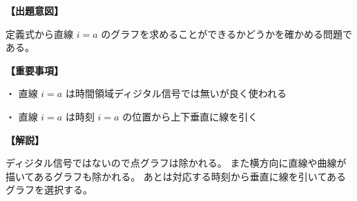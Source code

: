\noindent \textbf{【出題意図】}

\noindent 定義式から直線 $i = a$ のグラフを求めることができるかどうかを確かめる問題である。

\vspace{1em}
\noindent \textbf{【重要事項】}

\bigskip
\noindent ・ 直線 $i = a$ は時間領域ディジタル信号では無いが良く使われる

\bigskip
\noindent ・ 直線 $i = a$ は時刻 $i=a$ の位置から上下垂直に線を引く


\vspace{1em}
\noindent \textbf{【解説】}

\noindent ディジタル信号ではないので点グラフは除かれる。
また横方向に直線や曲線が描いてあるグラフも除かれる。
あとは対応する時刻から垂直に線を引いてあるグラフを選択する。
